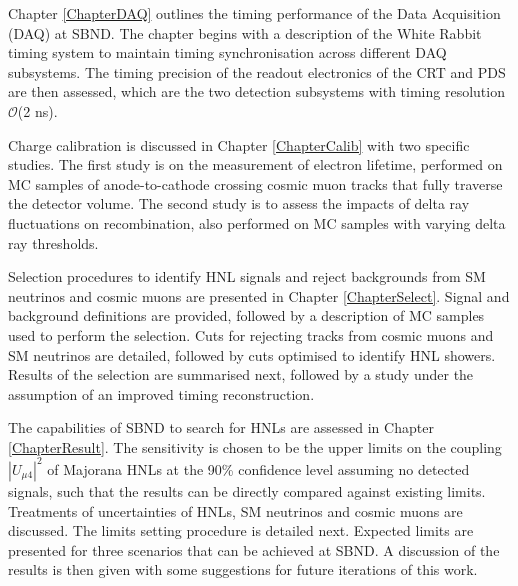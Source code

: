 Chapter \ref{ChapterDAQ} outlines the timing performance of the Data Acquisition (DAQ) at SBND.
The chapter begins with a description of the White Rabbit timing system to maintain timing synchronisation across different DAQ subsystems.
The timing precision of the readout electronics of the CRT and PDS are then assessed, which are the two detection subsystems with timing resolution $\mathcal{O}$(2 ns).

Charge calibration is discussed in Chapter \ref{ChapterCalib} with two specific studies.
The first study is on the measurement of electron lifetime, performed on MC samples of anode-to-cathode crossing cosmic muon tracks that fully traverse the detector volume.
The second study is to assess the impacts of delta ray fluctuations on recombination, also performed on MC samples with varying delta ray thresholds.  
                                                                                                                                            
Selection procedures to identify HNL signals and reject backgrounds from SM neutrinos and cosmic muons are presented in Chapter \ref{ChapterSelect}.
Signal and background definitions are provided, followed by a description of MC samples used to perform the selection.
Cuts for rejecting tracks from cosmic muons and SM neutrinos are detailed, followed by cuts optimised to identify HNL showers.
Results of the selection are summarised next, followed by a study under the assumption of an improved timing reconstruction.
                                                                                                                                                     
The capabilities of SBND to search for HNLs are assessed in Chapter \ref{ChapterResult}.
The sensitivity is chosen to be the upper limits on the coupling $|U_{\mu4}|^2$ of Majorana HNLs at the 90\% confidence level assuming no detected signals, such that the results can be directly compared against existing limits.
Treatments of uncertainties of HNLs, SM neutrinos and cosmic muons are discussed.
The limits setting procedure is detailed next.
Expected limits are presented for three scenarios that can be achieved at SBND.
A discussion of the results is then given with some suggestions for future iterations of this work.                        

